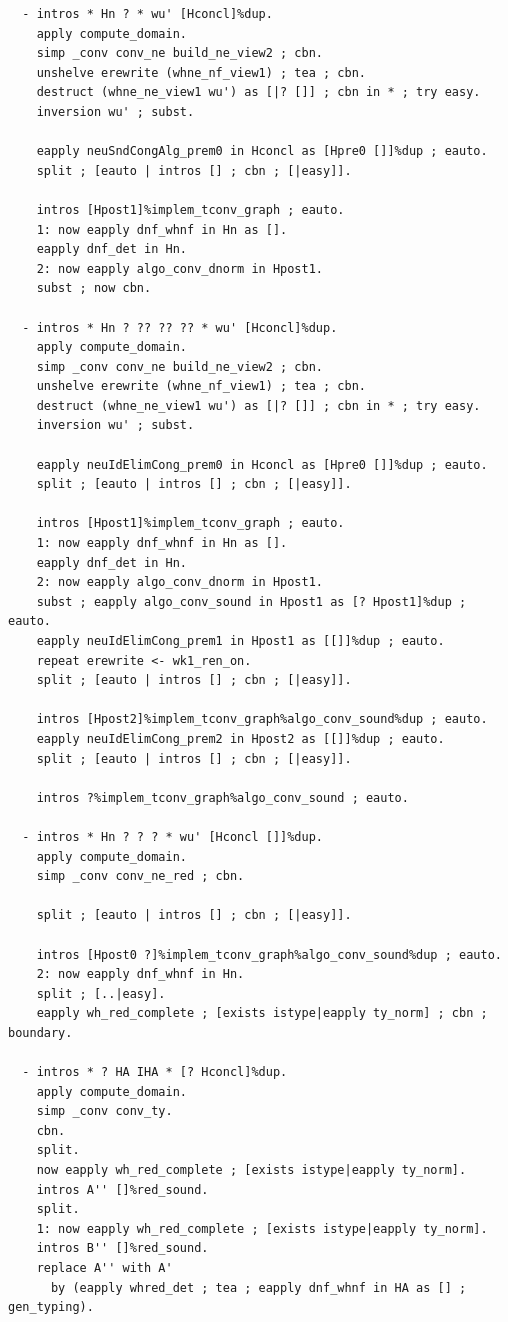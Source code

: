 \documentclass[10pt,a4paper]{amsart}
\begin{document}
\begin{lstlisting}
  - intros * Hn ? * wu' [Hconcl]%dup.
    apply compute_domain.
    simp _conv conv_ne build_ne_view2 ; cbn.
    unshelve erewrite (whne_nf_view1) ; tea ; cbn.
    destruct (whne_ne_view1 wu') as [|? []] ; cbn in * ; try easy.
    inversion wu' ; subst.

    eapply neuSndCongAlg_prem0 in Hconcl as [Hpre0 []]%dup ; eauto.
    split ; [eauto | intros [] ; cbn ; [|easy]].

    intros [Hpost1]%implem_tconv_graph ; eauto.
    1: now eapply dnf_whnf in Hn as [].
    eapply dnf_det in Hn.
    2: now eapply algo_conv_dnorm in Hpost1.
    subst ; now cbn.

  - intros * Hn ? ?? ?? ?? * wu' [Hconcl]%dup.
    apply compute_domain.
    simp _conv conv_ne build_ne_view2 ; cbn.
    unshelve erewrite (whne_nf_view1) ; tea ; cbn.
    destruct (whne_ne_view1 wu') as [|? []] ; cbn in * ; try easy.
    inversion wu' ; subst.

    eapply neuIdElimCong_prem0 in Hconcl as [Hpre0 []]%dup ; eauto.
    split ; [eauto | intros [] ; cbn ; [|easy]].

    intros [Hpost1]%implem_tconv_graph ; eauto.
    1: now eapply dnf_whnf in Hn as [].
    eapply dnf_det in Hn.
    2: now eapply algo_conv_dnorm in Hpost1.
    subst ; eapply algo_conv_sound in Hpost1 as [? Hpost1]%dup ; eauto.
    eapply neuIdElimCong_prem1 in Hpost1 as [[]]%dup ; eauto.
    repeat erewrite <- wk1_ren_on.
    split ; [eauto | intros [] ; cbn ; [|easy]].

    intros [Hpost2]%implem_tconv_graph%algo_conv_sound%dup ; eauto.
    eapply neuIdElimCong_prem2 in Hpost2 as [[]]%dup ; eauto.
    split ; [eauto | intros [] ; cbn ; [|easy]].

    intros ?%implem_tconv_graph%algo_conv_sound ; eauto.

  - intros * Hn ? ? ? * wu' [Hconcl []]%dup.
    apply compute_domain.
    simp _conv conv_ne_red ; cbn.

    split ; [eauto | intros [] ; cbn ; [|easy]].

    intros [Hpost0 ?]%implem_tconv_graph%algo_conv_sound%dup ; eauto.
    2: now eapply dnf_whnf in Hn.
    split ; [..|easy].
    eapply wh_red_complete ; [exists istype|eapply ty_norm] ; cbn ; boundary.
  
  - intros * ? HA IHA * [? Hconcl]%dup.
    apply compute_domain.
    simp _conv conv_ty.
    cbn.
    split.
    now eapply wh_red_complete ; [exists istype|eapply ty_norm].
    intros A'' []%red_sound.
    split.
    1: now eapply wh_red_complete ; [exists istype|eapply ty_norm].
    intros B'' []%red_sound.
    replace A'' with A'
      by (eapply whred_det ; tea ; eapply dnf_whnf in HA as [] ; gen_typing).


\end{lstlisting}
\end{document}
